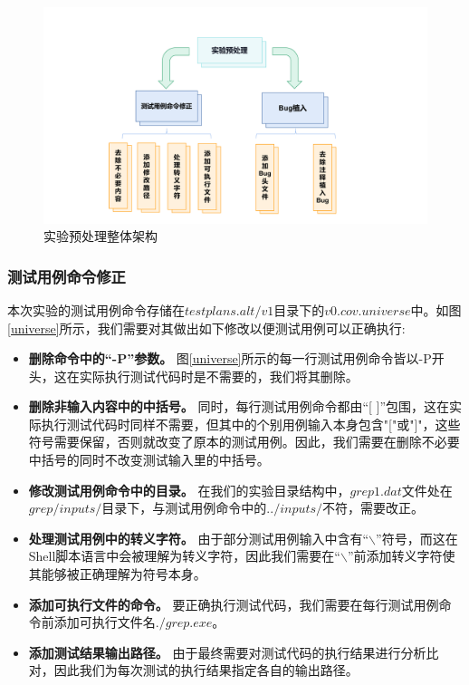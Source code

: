 \documentclass[12pt, a4paper, oneside,bibend=bibtex]{ctexart}
\begin{document}
\begin{figure}[htbp]
    \centering
    \includegraphics[width=16cm]{images/handle.pdf}
    \caption{实验预处理整体架构}
    \label{process}
\end{figure}

\subsubsection{测试用例命令修正}
本次实验的测试用例命令存储在$testplans.alt/v1$目录下的$v0.cov.universe$中。如图\ref{universe}所示，我们需要对其做出如下修改以便测试用例可以正确执行:
\begin{itemize}
    \item \textbf{删除命令中的“-P”参数。} 图\ref{universe}所示的每一行测试用例命令皆以-P开头，这在实际执行测试代码时是不需要的，我们将其删除。
    \item \textbf{删除非输入内容中的中括号。} 同时，每行测试用例命令都由“[ ]”包围，这在实际执行测试代码时同样不需要，但其中的个别用例输入本身包含"["或"]"，这些符号需要保留，否则就改变了原本的测试用例。因此，我们需要在删除不必要中括号的同时不改变测试输入里的中括号。
    \item \textbf{修改测试用例命令中的目录。} 在我们的实验目录结构中，$grep1.dat$文件处在$grep/inputs/$目录下，与测试用例命令中的$../inputs/$不符，需要改正。
    \item \textbf{处理测试用例中的转义字符。} 由于部分测试用例输入中含有“$\backslash$”符号，而这在Shell脚本语言中会被理解为转义字符，因此我们需要在“$\backslash$”前添加转义字符使其能够被正确理解为符号本身。
    \item \textbf{添加可执行文件的命令。} 要正确执行测试代码，我们需要在每行测试用例命令前添加可执行文件名$./grep.exe$。
    \item \textbf{添加测试结果输出路径。} 由于最终需要对测试代码的执行结果进行分析比对，因此我们为每次测试的执行结果指定各自的输出路径。
\end{itemize}
\end{document}
